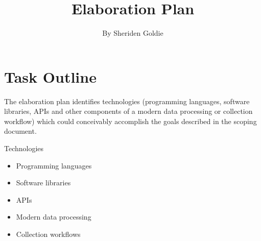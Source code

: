 \documentclass{article}
\title{Elaboration Plan}
\author{By Sheriden Goldie}
\date{}
\begin{document}
\maketitle

\section{Task Outline}

The elaboration plan identifies technologies (programming languages, software libraries, APIs and other components of a modern data processing or collection workflow) which could conceivably accomplish the goals described in the scoping document.

Technologies
\begin{itemize}
    \item Programming languages
    \item Software libraries
    \item APIs
    \item Modern data processing
    \item Collection workflows
\end{itemize}
\end{document}
